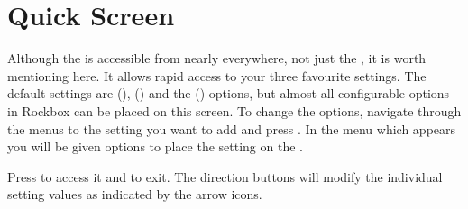 {
\section{\label{ref:QuickScreen}Quick Screen}
  Although the  is accessible from nearly everywhere,
  not just the , it is worth mentioning here.  It allows
  rapid access to your three favourite settings.  The default settings are
   (),
   () and the
   () options, but almost all
  configurable options in Rockbox can be placed on this screen.  To change the
  options, navigate through the menus to the setting you want to add and press
  \ActionStdContext.  In the menu which appears you will be given options
  to place the setting on the .
  
  Press \ActionStdQuickScreen{} to access it and \ActionQuickScreenExit{} to exit.
  The direction buttons will modify the individual setting values as indicated 
  by the arrow icons.
}
